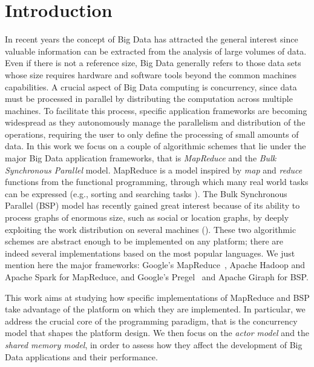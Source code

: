 \documentclass[a4paper]{article}
\numberwithin{equation}{section}
\begin{document}
\section{Introduction}
\label{sec:introduction}
In recent years the concept of Big Data has attracted the general
interest since valuable information can be extracted from the analysis
of large volumes of data. Even if there is not a reference size, Big
Data generally refers to those data sets whose size requires hardware
and software tools beyond the common machines capabilities. 
A crucial aspect of Big Data computing is concurrency, since data must
be processed in parallel by distributing the computation across
multiple machines.
To facilitate this process, specific application frameworks are
becoming widespread as they autonomously manage the parallelism and
distribution of the operations, requiring the 
user to only define the processing of small amounts of data.
In this work we focus on a couple of algorithmic schemes that lie
under the major Big Data application frameworks, that is 
\textit{MapReduce} and the
\textit{Bulk Synchronous Parallel} model.  
MapReduce is a model inspired by \textit{map} and \textit{reduce}
functions from the functional programming, through which many real
world tasks can be expressed (e.g., sorting and searching tasks
\cite{petasort,goodrich_11_mapreduce-theory,DBLP:KajdanowiczKI13}).  
The Bulk Synchronous Parallel (BSP) model has recently gained great
interest because of its ability to process graphs of enormous size,
such as social or location graphs,
by deeply exploiting the work distribution on several
machines (\cite{Krizanc:1996:BSP:882471.883319,Bisseling:BSP,Valiant:2011:BMM:1889388.1889509}). 
These two algorithmic schemes are abstract enough to be implemented on
any platform; there are indeed several implementations based on the
most popular languages. We just mention here the major frameworks:
Google's MapReduce~\cite{Dean04mapreduce:simplified}, 
Apache Hadoop and Apache Spark for MapReduce, and Google's Pregel~\cite{Pregel} and 
Apache Giraph for BSP.  

This work aims at studying how specific implementations of MapReduce
and BSP take advantage of the platform on which they are implemented.
In particular, we address the crucial core of the programming
paradigm, that is the concurrency model that shapes the platform
design. We then focus on the \emph{actor model} and the 
\emph{shared memory model}, in order to assess how they affect the
development of Big Data applications and their performance. 
\end{document}
